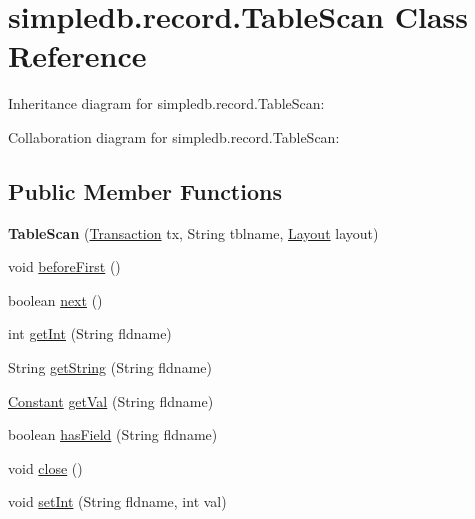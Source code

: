\hypertarget{classsimpledb_1_1record_1_1TableScan}{}\section{simpledb.\+record.\+Table\+Scan Class Reference}
\label{classsimpledb_1_1record_1_1TableScan}


Inheritance diagram for simpledb.\+record.\+Table\+Scan\+:


Collaboration diagram for simpledb.\+record.\+Table\+Scan\+:
\subsection*{Public Member Functions}
\begin{DoxyCompactItemize}
\item 
\mbox{\label{classsimpledb_1_1record_1_1TableScan_a72c0b36932ac3399d1aac7b4c8338a45}} 
{\bfseries Table\+Scan} (\hyperlink{classsimpledb_1_1tx_1_1Transaction}{Transaction} tx, String tblname, \hyperlink{classsimpledb_1_1record_1_1Layout}{Layout} layout)
\item 
void \hyperlink{classsimpledb_1_1record_1_1TableScan_a2b5a99c638ace01efded11dd93cf9240}{before\+First} ()
\item 
boolean \hyperlink{classsimpledb_1_1record_1_1TableScan_aefc2187ef691253a8d569d01f423c18b}{next} ()
\item 
int \hyperlink{classsimpledb_1_1record_1_1TableScan_abb08c41204e3130311ed1f264778b750}{get\+Int} (String fldname)
\item 
String \hyperlink{classsimpledb_1_1record_1_1TableScan_af43f30e2489c5cd23566cb60271db331}{get\+String} (String fldname)
\item 
\hyperlink{classsimpledb_1_1query_1_1Constant}{Constant} \hyperlink{classsimpledb_1_1record_1_1TableScan_a0a4ad2c10c2c60f3c984876c672e15e1}{get\+Val} (String fldname)
\item 
boolean \hyperlink{classsimpledb_1_1record_1_1TableScan_aad90f69cc2d14ecfe8a7854e8ed60548}{has\+Field} (String fldname)
\item 
void \hyperlink{classsimpledb_1_1record_1_1TableScan_aff0239675c54b7e5d7c72695a7169c7c}{close} ()
\item 
void \hyperlink{classsimpledb_1_1record_1_1TableScan_af36f97fd4163b889c0e3d76a824406c2}{set\+Int} (String fldname, int val)
\item 

\end{DoxyCompactItemize}
